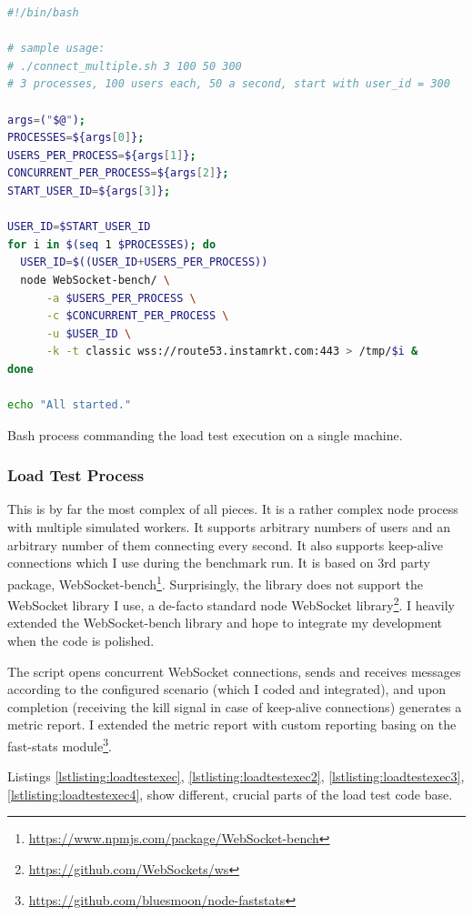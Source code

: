 \documentclass{uvamscse}
\begin{document}
\begin{sourcecode}[H]
\begin{lstlisting}[style=mono, language=bash]
#!/bin/bash

# sample usage:
# ./connect_multiple.sh 3 100 50 300
# 3 processes, 100 users each, 50 a second, start with user_id = 300

args=("$@");
PROCESSES=${args[0]};
USERS_PER_PROCESS=${args[1]};
CONCURRENT_PER_PROCESS=${args[2]};
START_USER_ID=${args[3]};

USER_ID=$START_USER_ID
for i in $(seq 1 $PROCESSES); do
  USER_ID=$((USER_ID+USERS_PER_PROCESS))
  node WebSocket-bench/ \
      -a $USERS_PER_PROCESS \
      -c $CONCURRENT_PER_PROCESS \
      -u $USER_ID \
      -k -t classic wss://route53.instamrkt.com:443 > /tmp/$i &
done

echo "All started."

\end{lstlisting}
\caption{Bash process commanding the load test execution on a single machine.}
\label{lstlisting:bashloadtest}
\end{sourcecode}


\subsubsection{Load Test Process}
This is by far the most complex of all pieces. It is a rather complex node process with multiple simulated workers. It supports arbitrary numbers of users and an arbitrary number of them connecting every second. It also supports keep-alive connections which I use during the benchmark run. It is based on 3rd party package, WebSocket-bench\footnote{\url{https://www.npmjs.com/package/WebSocket-bench}}. Surprisingly, the library does not support the WebSocket library I use, a de-facto standard node WebSocket library\footnote{\url{https://github.com/WebSockets/ws}}. I heavily extended the WebSocket-bench library and hope to integrate my development when the code is polished.

The script opens concurrent WebSocket connections, sends and receives messages according to the configured scenario (which I coded and integrated), and upon completion (receiving the kill signal in case of keep-alive connections) generates a metric report. I extended the metric report with custom reporting basing on the fast-stats module\footnote{\url{https://github.com/bluesmoon/node-faststats}}.

Listings \ref{lstlisting:loadtestexec}, \ref{lstlisting:loadtestexec2}, \ref{lstlisting:loadtestexec3}, \ref{lstlisting:loadtestexec4},  show different, crucial parts of the load test code base.
\end{document}
